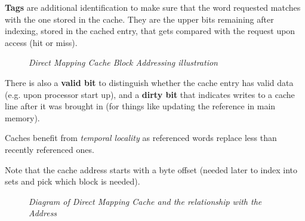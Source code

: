 \documentclass[11pt]{article}
\begin{document}
\textbf{Tags} are additional identification to make sure that the word requested matches with the one stored in the cache. They are the upper bits remaining after indexing, stored in the cached entry, that gets compared with the request upon access (hit or miss).

\begin{figure}[htbp]
    \centering
    \caption{\textit{Direct Mapping Cache Block Addressing illustration}}
\end{figure}

There is also a \textbf{valid bit} to distinguish whether the cache entry has valid data (e.g. upon processor start up), and a \textbf{dirty bit} that indicates writes to a cache line after it was brought in (for things like updating the reference in main memory).

Caches benefit from \textit{temporal locality} as referenced words replace less than recently referenced ones.

Note that the cache address starts with a byte offset (needed later to index into sets and pick which block is needed).

\begin{figure}[htbp]
    \centering
    \caption{\textit{Diagram of Direct Mapping Cache and the relationship with the Address}}
\end{figure}
\end{document}

